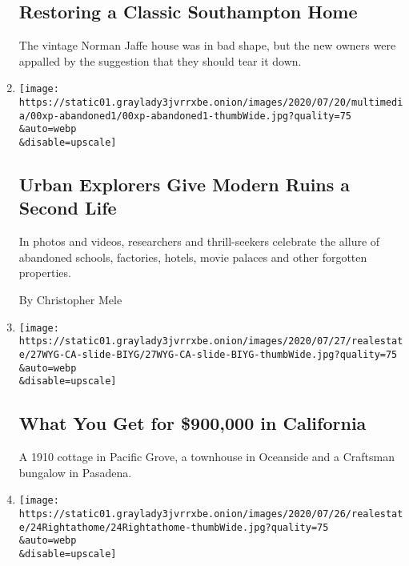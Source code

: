 \begin{enumerate}
  \hypertarget{restoring-a-classic-southampton-home}{%
  \subsection{Restoring a Classic Southampton
  Home}\label{restoring-a-classic-southampton-home}}

  The vintage Norman Jaffe house was in bad shape, but the new owners
  were appalled by the suggestion that they should tear it down.
\item
  \href{/2020/07/27/us/abandoned-properties-to-explore.html}{}

  \texttt{[image: https://static01.graylady3jvrrxbe.onion/images/2020/07/20/multimedia/00xp-abandoned1/00xp-abandoned1-thumbWide.jpg?quality=75\\\&auto=webp\\\&disable=upscale]}

  \hypertarget{urban-explorers-give-modern-ruins-a-second-life}{%
  \subsection{Urban Explorers Give Modern Ruins a Second
  Life}\label{urban-explorers-give-modern-ruins-a-second-life}}

  In photos and videos, researchers and thrill-seekers celebrate the
  allure of abandoned schools, factories, hotels, movie palaces and
  other forgotten properties.

  By Christopher Mele
\item
  \href{/slideshow/2020/07/27/realestate/what-you-get-for-900000-in-california.html}{}

  \texttt{[image: https://static01.graylady3jvrrxbe.onion/images/2020/07/27/realestate/27WYG-CA-slide-BIYG/27WYG-CA-slide-BIYG-thumbWide.jpg?quality=75\\\&auto=webp\\\&disable=upscale]}

  \hypertarget{what-you-get-for-900000-in-california}{%
  \subsection{What You Get for \$900,000 in
  California}\label{what-you-get-for-900000-in-california}}

  A 1910 cottage in Pacific Grove, a townhouse in Oceanside and a
  Craftsman bungalow in Pasadena.
\item
  \href{/2020/07/24/realestate/pandemic-housekeeping.html}{}

  \texttt{[image: https://static01.graylady3jvrrxbe.onion/images/2020/07/26/realestate/24Rightathome/24Rightathome-thumbWide.jpg?quality=75\\\&auto=webp\\\&disable=upscale]}


\end{enumerate}
